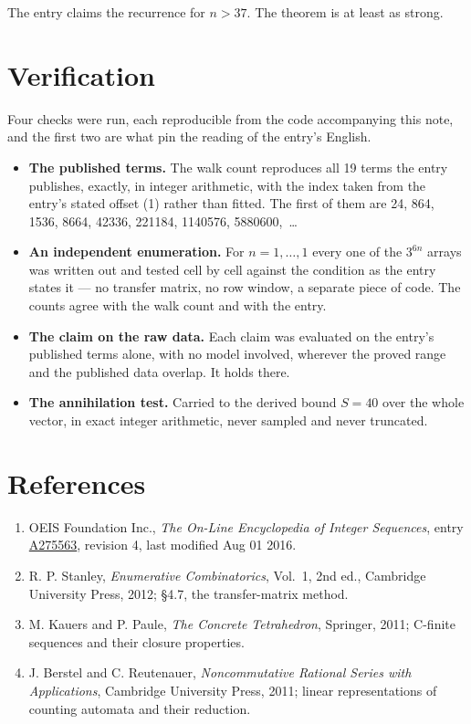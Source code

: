 \documentclass[11pt]{article}
\theoremstyle{definition}
\begin{document}
The entry claims the recurrence for $n > 37$. The theorem is at least as strong.

\section{Verification}

Four checks were run, each reproducible from the code accompanying this note, and the first two are what pin the reading of the entry's English.

\begin{itemize}

\item {\bfseries The published terms.} The walk count reproduces all 19 terms the entry publishes, exactly, in integer arithmetic, with the index taken from the entry's stated offset (1) rather than fitted. The first of them are 24, 864, 1536, 8664, 42336, 221184, 1140576, 5880600,~\dots

\item {\bfseries An independent enumeration.} For $n = 1,\dots,1$ every one of the $3^{6n}$ arrays was written out and tested cell by cell against the condition as the entry states it --- no transfer matrix, no row window, a separate piece of code. The counts agree with the walk count and with the entry.

\item {\bfseries The claim on the raw data.} Each claim was evaluated on the entry's published terms alone, with no model involved, wherever the proved range and the published data overlap. It holds there.

\item {\bfseries The annihilation test.} Carried to the derived bound $S = 40$ over the whole vector, in exact integer arithmetic, never sampled and never truncated.

\end{itemize}

\section{References}

\begin{enumerate}

\item OEIS Foundation Inc., \emph{The On-Line Encyclopedia of Integer Sequences}, entry \href{https://oeis.org/A275563}{A275563}, revision 4, last modified Aug 01 2016.

\item R. P. Stanley, \emph{Enumerative Combinatorics}, Vol.~1, 2nd ed., Cambridge University Press, 2012; \S4.7, the transfer-matrix method.

\item M. Kauers and P. Paule, \emph{The Concrete Tetrahedron}, Springer, 2011; C-finite sequences and their closure properties.

\item J. Berstel and C. Reutenauer, \emph{Noncommutative Rational Series with Applications}, Cambridge University Press, 2011; linear representations of counting automata and their reduction.

\end{enumerate}
\end{document}
